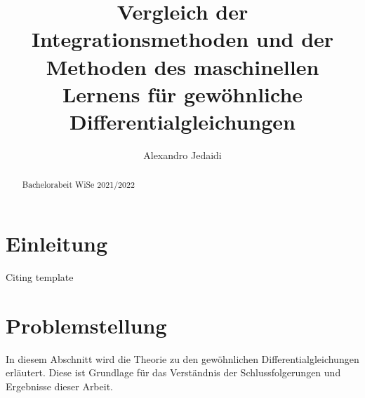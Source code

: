 \documentclass[
    paper=a4, %
    fontsize=10pt,  %
]{article}         %
\author{Alexandro Jedaidi}
\title{\textbf{Vergleich der Integrationsmethoden und der Methoden des maschinellen Lernens für gewöhnliche Differentialgleichungen}}
\date{}
\begin{document}
    \maketitle
    \tableofcontents
    \newpage
    \begin{abstract}
        Bachelorabeit WiSe 2021/2022
    \end{abstract}
    \pagestyle{headings}

    \section{Einleitung}
    Citing template\cite{Google}

    \section{Problemstellung}
    In diesem Abschnitt wird die Theorie zu den gewöhnlichen Differentialgleichungen erläutert. Diese ist Grundlage für
    das Verständnis der Schlussfolgerungen und Ergebnisse dieser Arbeit.
\end{document}
